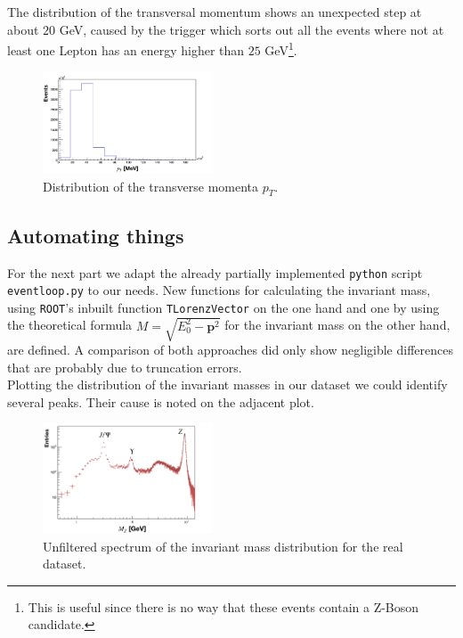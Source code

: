 \documentclass[twocolumn,
			   showpacs,%
               nofootinbib,
               aps,%
               prd,
               notitlepage,
               showkeys,
               10pt]{revtex4-1}
\begin{document}
The distribution of the transversal momentum shows an unexpected step at about $20$ GeV, caused by the trigger which sorts out all the events where not at least one Lepton has an energy higher than $25$ GeV\footnote{This is useful since there is no way that these events contain a Z-Boson candidate.}.
\begin{figure}[H]
	\centering
	\includegraphics[width=0.45\textwidth]{figures/plots/TransverseMomentum_corr}
	\caption{Distribution of the transverse momenta $p_T$.}
\end{figure}

\subsection{Automating things}
For the next part we adapt the already partially implemented \verb|python| script \verb|eventloop.py| to our needs. New functions for calculating the invariant mass, using \verb|ROOT|'s inbuilt function \verb|TLorenzVector| on the one hand and one by using the theoretical formula $M = \sqrt{E_0^2 - \mathbf{p}^2}$ for the invariant mass on the other hand, are defined. A comparison of both approaches did only show negligible differences that are probably due to truncation errors.\\

Plotting the distribution of the invariant masses in our dataset we could identify several peaks. Their cause is noted on the adjacent plot.
\begin{figure}[H]
	\centering
	\includegraphics[width=0.45\textwidth]{figures/plots/MassDist_Data_corr}
	\caption{Unfiltered spectrum of the invariant mass distribution for the real dataset.}
\end{figure}
\end{document}

